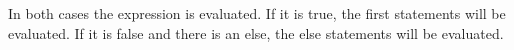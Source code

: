 \documentclass[12pt]{article}
\begin{document}
In both cases the expression is evaluated. If it is true, the first statements will be evaluated.
If it is false and there is an else, the else statements will be evaluated.


\end{document}
